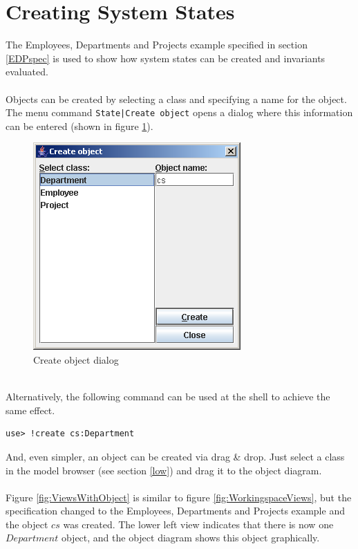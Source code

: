 \documentclass[a4paper,titlepage,oneside,final]{scrreprt} %
\begin{document}
\section{Creating System States}
The Employees, Departments and Projects example specified in section \ref{EDPspec}
is used to show how system states can be created and invariants evaluated.\\\\
Objects can be created by selecting a class and specifying a name for the object.
The menu command \verb+State|Create object+ opens a dialog where this information can be entered
(shown in figure \ref{fig:CreateObject}).
\begin{figure}[ht]
\centering
\includegraphics[scale=0.7]{Screenshots/GUI/CreateObject.png}
\caption{Create object dialog}
\label{fig:CreateObject}
\end{figure}\\
Alternatively, the following command can be used at the shell to achieve the same effect.
\begin{verbatim}
use> !create cs:Department
\end{verbatim}
And, even simpler, an object can be created via drag \& drop.
Just select a class in the model browser (see section \ref{low})
and drag it to the object diagram.\\\\
Figure \ref{fig:ViewsWithObject} is similar to figure \ref{fig:WorkingspaceViews},
but the specification changed to the Employees, Departments and Projects example
and the object $\mathit{cs}$ was created.
The lower left view indicates that
there is now one $\mathit{Department}$ object,
and the object diagram shows this object graphically.\\
\end{document}
